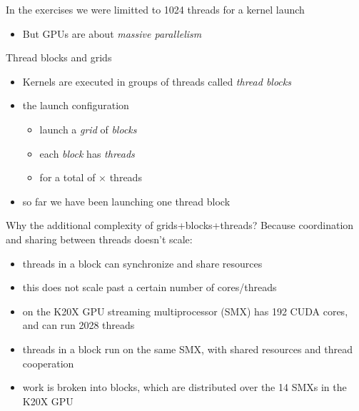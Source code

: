 
\begin{frame}[fragile]{}
    \begin{info}{}
        In the \axpy exercises we were limitted to 1024 threads for a kernel launch
        \begin{itemize}
            \item But GPUs are about \emph{massive parallelism}
        \end{itemize}
    \end{info}

    \begin{info}{Thread blocks and grids}
        \begin{itemize}
            \item Kernels are executed in groups of threads called \emph{thread blocks}
            \item the launch configuration 
            \begin{itemize}
                \item launch a \emph{grid} of  \emph{blocks}
                \item each \emph{block} has  \emph{threads}
                \item for a total of $\times$ threads
            \end{itemize}
            \item so far we have been launching one thread block 
        \end{itemize}
    \end{info}

\end{frame}

\begin{frame}[fragile]{}
    \begin{info}{Why the additional complexity of grids+blocks+threads?}
        Because coordination and sharing between threads doesn't scale:
        \begin{itemize}
            \item threads in a block can synchronize and share resources
            \item this does not scale past a certain number of cores/threads
            \item on the K20X GPU streaming multiprocessor (SMX) has 192 CUDA cores, and can run 2028 threads
            \item threads in a block run on the same SMX, with shared resources and thread cooperation
            \item work is broken into blocks, which are distributed over the 14 SMXs in the K20X GPU
        \end{itemize}
    \end{info}
\end{frame}

